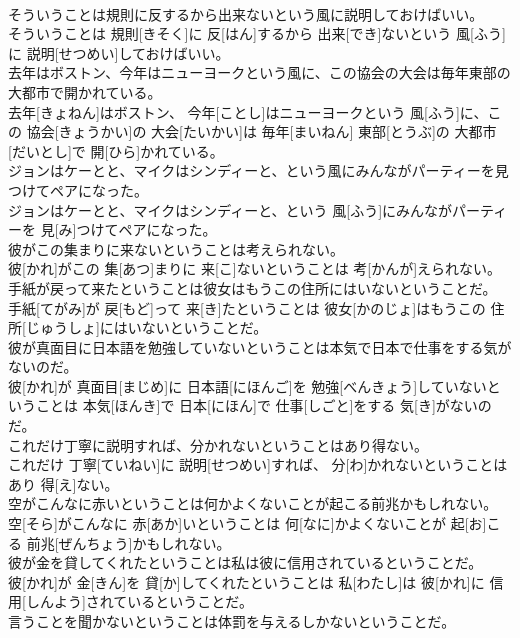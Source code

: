 \documentclass[8pt]{extreport}
\begin{document}
\begin{CJK}{UTF8}{min}
\\	そういうことは規則に反するから出来ないという風に説明しておけばいい。	
\\	そういうことは 規則[きそく]に 反[はん]するから 出来[でき]ないという 風[ふう]に 説明[せつめい]しておけばいい。
\\	去年はボストン、今年はニューヨークという風に、この協会の大会は毎年東部の大都市で開かれている。	
\\	去年[きょねん]はボストン、 今年[ことし]はニューヨークという 風[ふう]に、この 協会[きょうかい]の 大会[たいかい]は 毎年[まいねん] 東部[とうぶ]の 大都市[だいとし]で 開[ひら]かれている。
\\	ジョンはケーとと、マイクはシンディーと、という風にみんながパーティーを見つけてペアになった。	
\\	ジョンはケーとと、マイクはシンディーと、という 風[ふう]にみんながパーティーを 見[み]つけてペアになった。
\\	彼がこの集まりに来ないということは考えられない。	
\\	彼[かれ]がこの 集[あつ]まりに 来[こ]ないということは 考[かんが]えられない。
\\	手紙が戻って来たということは彼女はもうこの住所にはいないということだ。	
\\	手紙[てがみ]が 戻[もど]って 来[き]たということは 彼女[かのじょ]はもうこの 住所[じゅうしょ]にはいないということだ。
\\	彼が真面目に日本語を勉強していないということは本気で日本で仕事をする気がないのだ。	
\\	彼[かれ]が 真面目[まじめ]に 日本語[にほんご]を 勉強[べんきょう]していないということは 本気[ほんき]で 日本[にほん]で 仕事[しごと]をする 気[き]がないのだ。
\\	これだけ丁寧に説明すれば、分かれないということはあり得ない。	
\\	これだけ 丁寧[ていねい]に 説明[せつめい]すれば、 分[わ]かれないということはあり 得[え]ない。
\\	空がこんなに赤いということは何かよくないことが起こる前兆かもしれない。	
\\	空[そら]がこんなに 赤[あか]いということは 何[なに]かよくないことが 起[お]こる 前兆[ぜんちょう]かもしれない。
\\	彼が金を貸してくれたということは私は彼に信用されているということだ。	
\\	彼[かれ]が 金[きん]を 貸[か]してくれたということは 私[わたし]は 彼[かれ]に 信用[しんよう]されているということだ。
\\	言うことを聞かないということは体罰を与えるしかないということだ。	

\end{CJK}
\end{document}
